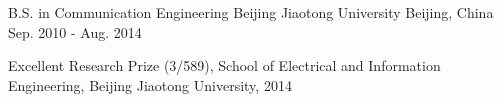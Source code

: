 \begin{cventries}
  \cventry
    {B.S. in Communication Engineering} %
    {Beijing Jiaotong University} %
    {Beijing, China} %
    {Sep. 2010 - Aug. 2014} %
    {
      \begin{cvitems} %
        \item {Excellent Research Prize (3/589), School of Electrical and Information Engineering, Beijing Jiaotong University, 2014}
      \end{cvitems}
    }
\end{cventries}

